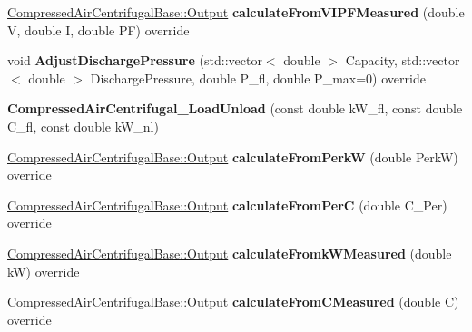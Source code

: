 \begin{DoxyCompactItemize}
\hyperlink{struct_compressed_air_centrifugal_base_1_1_output}{Compressed\+Air\+Centrifugal\+Base\+::\+Output} {\bfseries calculate\+From\+V\+I\+P\+F\+Measured} (double V, double I, double PF) override
\item 
\mbox{\label{class_compressed_air_centrifugal___load_unload_a7ba88b9798eeff1a022d5a9630884d56}} 
void {\bfseries Adjust\+Discharge\+Pressure} (std\+::vector$<$ double $>$ Capacity, std\+::vector$<$ double $>$ Discharge\+Pressure, double P\+\_\+fl, double P\+\_\+max=0) override
\item 
\mbox{\label{class_compressed_air_centrifugal___load_unload_ad01a5b7853ae89956c664669c8baf326}} 
{\bfseries Compressed\+Air\+Centrifugal\+\_\+\+Load\+Unload} (const double k\+W\+\_\+fl, const double C\+\_\+fl, const double k\+W\+\_\+nl)
\item 
\mbox{\label{class_compressed_air_centrifugal___load_unload_a05415e81aec9dca3bc85b7e354225ff7}} 
\hyperlink{struct_compressed_air_centrifugal_base_1_1_output}{Compressed\+Air\+Centrifugal\+Base\+::\+Output} {\bfseries calculate\+From\+PerkW} (double PerkW) override
\item 
\mbox{\label{class_compressed_air_centrifugal___load_unload_a02cd64d091bca0721f22b9f9926bdde3}} 
\hyperlink{struct_compressed_air_centrifugal_base_1_1_output}{Compressed\+Air\+Centrifugal\+Base\+::\+Output} {\bfseries calculate\+From\+PerC} (double C\+\_\+\+Per) override
\item 
\mbox{\label{class_compressed_air_centrifugal___load_unload_a3b01f59fff4823fb2a488d0f2258579f}} 
\hyperlink{struct_compressed_air_centrifugal_base_1_1_output}{Compressed\+Air\+Centrifugal\+Base\+::\+Output} {\bfseries calculate\+Fromk\+W\+Measured} (double kW) override
\item 
\mbox{\label{class_compressed_air_centrifugal___load_unload_aa85616d72a1b86e19fc86b4c777aa8ec}} 
\hyperlink{struct_compressed_air_centrifugal_base_1_1_output}{Compressed\+Air\+Centrifugal\+Base\+::\+Output} {\bfseries calculate\+From\+C\+Measured} (double C) override

\end{DoxyCompactItemize}
